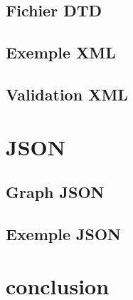 \documentclass[a4paper]{article}
\begin{document}
\vspace{170px}

\subsection{Fichier DTD}

\subsection{Exemple XML}

\subsection{Validation XML}


\section{JSON}
\subsection{Graph JSON}
\subsection{Exemple JSON}


\section{conclusion}
\end{document}
